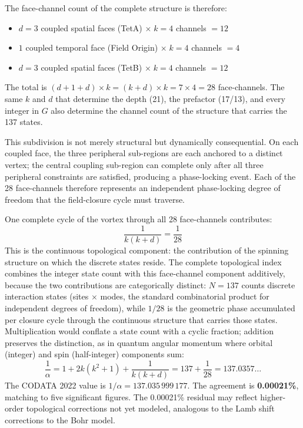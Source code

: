 \documentclass[aps,prd,preprint,superscriptaddress,showpacs,preprintnumbers,amsmath,amssymb,nofootinbib]{revtex4-2}
\begin{document}
The face-channel count of the complete structure is therefore:
\begin{itemize}
\item $d = 3$ coupled spatial faces (TetA) $\times\; k = 4$ channels $= 12$
\item $1$ coupled temporal face (Field Origin) $\times\; k = 4$ channels $= 4$
\item $d = 3$ coupled spatial faces (TetB) $\times\; k = 4$ channels $= 12$
\end{itemize}
The total is $(d + 1 + d) \times k = (k + d) \times k = 7 \times 4 = 28$ face-channels. The same $k$ and $d$ that determine the depth (21), the prefactor (17/13), and every integer in $G$ also determine the channel count of the structure that carries the 137 states.

This subdivision is not merely structural but dynamically consequential. On each coupled face, the three peripheral sub-regions are each anchored to a distinct vertex; the central coupling sub-region can complete only after all three peripheral constraints are satisfied, producing a phase-locking event. Each of the 28 face-channels therefore represents an independent phase-locking degree of freedom that the field-closure cycle must traverse.

One complete cycle of the vortex through all 28 face-channels contributes:
\begin{equation*}
\frac{1}{k(k+d)} = \frac{1}{28}
\end{equation*}
This is the continuous topological component: the contribution of the spinning structure on which the discrete states reside. The complete topological index combines the integer state count with this face-channel component additively, because the two contributions are categorically distinct: $N = 137$ counts discrete interaction states (sites $\times$ modes, the standard combinatorial product for independent degrees of freedom), while $1/28$ is the geometric phase accumulated per closure cycle through the continuous structure that carries those states. Multiplication would conflate a state count with a cyclic fraction; addition preserves the distinction, as in quantum angular momentum where orbital (integer) and spin (half-integer) components sum:
\begin{equation}
\frac{1}{\alpha} = 1 + 2k(k^2 + 1) + \frac{1}{k(k + d)} = 137 + \frac{1}{28} = 137.0357\ldots
\label{eq:alpha-breadth}
\end{equation}
The CODATA 2022 value is $1/\alpha = 137.035\,999\,177$. The agreement is \textbf{0.00021\%}, matching to five significant figures. The 0.00021\% residual may reflect higher-order topological corrections not yet modeled, analogous to the Lamb shift corrections to the Bohr model.
\end{document}

